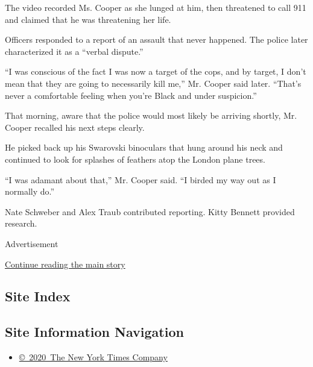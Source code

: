 The video recorded Ms. Cooper as she lunged at him, then threatened to
call 911 and claimed that he was threatening her life.

Officers responded to a report of an assault that never happened. The
police later characterized it as a ``verbal dispute.''

``I was conscious of the fact I was now a target of the cops, and by
target, I don't mean that they are going to necessarily kill me,'' Mr.
Cooper said later. ``That's never a comfortable feeling when you're
Black and under suspicion.''

That morning, aware that the police would most likely be arriving
shortly, Mr. Cooper recalled his next steps clearly.

He picked back up his Swarovski binoculars that hung around his neck and
continued to look for splashes of feathers atop the London plane trees.

``I was adamant about that,'' Mr. Cooper said. ``I birded my way out as
I normally do.''

Nate Schweber and Alex Traub contributed reporting. Kitty Bennett
provided research.

Advertisement

\protect\hyperlink{after-bottom}{Continue reading the main story}

\hypertarget{site-index}{%
\subsection{Site Index}\label{site-index}}

\hypertarget{site-information-navigation}{%
\subsection{Site Information
Navigation}\label{site-information-navigation}}

\begin{itemize}
\tightlist
\item
  \href{https://help.nytimes3xbfgragh.onion/hc/en-us/articles/115014792127-Copyright-notice}{©~2020~The
  New York Times Company}
\end{itemize}

